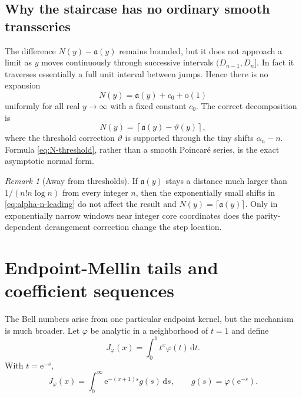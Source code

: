 \documentclass[11pt,a4paper]{article}
\numberwithin{equation}{section}
\theoremstyle{definition}
\theoremstyle{remark}
\newtheorem{remark}[theorem]{Remark}
\newcommand{\e}{\mathrm e}
\newcommand{\dd}{\,\mathrm d}
\newcommand{\littleo}{\mathrm o}
\newcommand{\InvCore}{\mathfrak a}
\begin{document}
\subsection{Why the staircase has no ordinary smooth transseries}

The difference $N(y)-\InvCore(y)$ remains bounded, but it does not approach
a limit as $y$ moves continuously through successive intervals
$(D_{n-1},D_n]$.  In fact it traverses essentially a full unit interval
between jumps.  Hence there is no expansion
\begin{equation}\label{eq:no-smooth-staircase}
 N(y)=\InvCore(y)+c_0+\littleo(1)
\end{equation}
uniformly for all real $y\to\infty$ with a fixed constant $c_0$.  The
correct decomposition is
\begin{equation}\label{eq:staircase-decomp}
 N(y)=\left\lceil\InvCore(y)-\vartheta(y)\right\rceil,
\end{equation}
where the threshold correction $\vartheta$ is supported through the tiny
shifts $\alpha_n-n$.  Formula \eqref{eq:N-threshold}, rather than a smooth
Poincar\'e series, is the exact asymptotic normal form.

\begin{remark}[Away from thresholds]
If $\InvCore(y)$ stays a distance much larger than
$1/(n!n\log n)$ from every integer $n$, then the exponentially small shifts
in \eqref{eq:alpha-n-leading} do not affect the result and
$N(y)=\lceil\InvCore(y)\rceil$.  Only in exponentially narrow windows near
integer core coordinates does the parity-dependent derangement correction
change the step location.
\end{remark}

\section{Endpoint-Mellin tails and coefficient sequences}
\label{sec:endpoint-Mellin}

The Bell numbers arise from one particular endpoint kernel, but the
mechanism is much broader.  Let $\varphi$ be analytic in a neighborhood of
$t=1$ and define
\begin{equation}\label{eq:Jphi}
 J_\varphi(x)=\int_0^1t^x\varphi(t)\dd t.
\end{equation}
With $t=\e^{-s}$,
\begin{equation}\label{eq:Jphi-Laplace}
 J_\varphi(x)=\int_0^\infty\e^{-(x+1)s}
 g(s)\dd s,
 \qquad g(s)=\varphi(\e^{-s}).
\end{equation}
\end{document}
